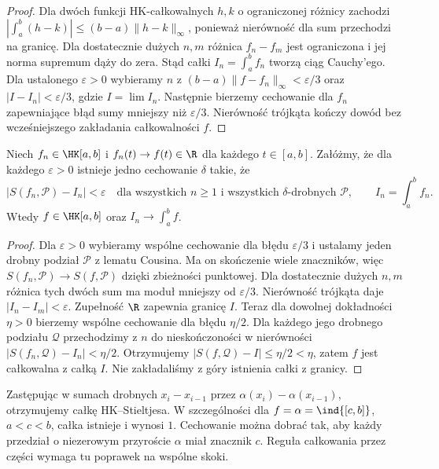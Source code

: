 \begin{proof}
Dla dwóch funkcji HK-całkowalnych $h,k$ o ograniczonej różnicy zachodzi $|\int_a^b(h-k)|\le(b-a)\|h-k\|_\infty$, ponieważ nierówność dla sum przechodzi na granicę. Dla dostatecznie dużych $n,m$ różnica $f_n-f_m$ jest ograniczona i jej norma supremum dąży do zera. Stąd całki $I_n=\int_a^bf_n$ tworzą ciąg Cauchy'ego. Dla ustalonego $\varepsilon>0$ wybieramy $n$ z $(b-a)\|f-f_n\|_\infty<\varepsilon/3$ oraz $|I-I_n|<\varepsilon/3$, gdzie $I=\lim I_n$. Następnie bierzemy cechowanie dla $f_n$ zapewniające błąd sumy mniejszy niż $\varepsilon/3$. Nierówność trójkąta kończy dowód bez wcześniejszego zakładania całkowalności $f$.
\end{proof}


\begin{twierdzenie}
\label{ma1:kh:thm:kh-equiintegrability}\label{it:thm:kh-equiintegrability}
Niech $f_n\in\HK[a,b]$ i $f_n(t)\to f(t)\in\R$ dla każdego $t\in[a,b]$. Załóżmy, że dla każdego $\varepsilon>0$ istnieje jedno cechowanie $\delta$ takie, że
\[
 |S(f_n,\mathcal P)-I_n|<\varepsilon
 \quad\text{dla wszystkich }n\ge1
 \text{ i wszystkich }\delta\text{-drobnych }\mathcal P,
 \qquad I_n=\int_a^b f_n.
\]
Wtedy $f\in\HK[a,b]$ oraz $I_n\to\int_a^b f$.
\end{twierdzenie}
\begin{proof}
Dla $\varepsilon>0$ wybieramy wspólne cechowanie dla błędu $\varepsilon/3$ i ustalamy jeden drobny podział $\mathcal P$ z lematu Cousina. Ma on skończenie wiele znaczników, więc $S(f_n,\mathcal P)\to S(f,\mathcal P)$ dzięki zbieżności punktowej. Dla dostatecznie dużych $n,m$ różnica tych dwóch sum ma moduł mniejszy od $\varepsilon/3$. Nierówność trójkąta daje $|I_n-I_m|<\varepsilon$. Zupełność $\R$ zapewnia granicę $I$. Teraz dla dowolnej dokładności $\eta>0$ bierzemy wspólne cechowanie dla błędu $\eta/2$. Dla każdego jego drobnego podziału $\mathcal Q$ przechodzimy z $n$ do nieskończoności w nierówności $|S(f_n,\mathcal Q)-I_n|<\eta/2$. Otrzymujemy $|S(f,\mathcal Q)-I|\le\eta/2<\eta$, zatem $f$ jest całkowalna z całką $I$. Nie zakładaliśmy z góry istnienia całki z granicy.
\end{proof}

\begin{uwaga}
Zastępując w sumach drobnych $x_i-x_{i-1}$ przez $\alpha(x_i)-\alpha(x_{i-1})$, otrzymujemy całkę HK--Stieltjesa. W szczególności dla $f=\alpha=\ind{[c,b]}$, $a<c<b$, całka istnieje i wynosi $1$. Cechowanie można dobrać tak, aby każdy przedział o niezerowym przyroście $\alpha$ miał znacznik $c$. Reguła całkowania przez części wymaga tu poprawek na wspólne skoki.
\end{uwaga}

